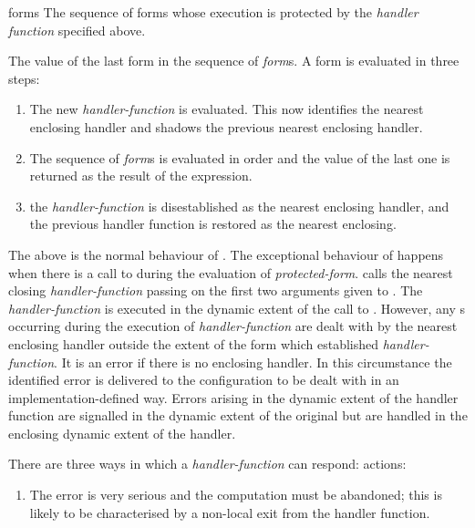 \begin{optDefinition}
\begin{arguments}
    \item[forms] The sequence of forms whose execution is protected by the {\em
        handler function} specified above.
\end{arguments}
%
\result%
The value of the last form in the sequence of {\em form}s.
%
\remarks%
%
A  form is evaluated in three steps:
\begin{enumerate}
    \item The new {\em handler-function} is evaluated. This now identifies the
    nearest enclosing handler and shadows the previous nearest enclosing
    handler.

    \item The sequence of {\em form}s is evaluated in order and the value of the
    last one is returned as the result of the 
    expression.

    \item the {\em handler-function} is disestablished as the nearest enclosing
    handler, and the previous handler function is restored as the nearest
    enclosing.
\end{enumerate}
%
The above is the normal behaviour of .  The exceptional
behaviour of  happens when there is a call to
 during the evaluation of {\em protected-form}.
 calls the nearest closing {\em handler-function} passing on
the first two arguments given to .  The {\em
    handler-function} is executed in the dynamic extent of the call to
.  However, any s occurring during the
execution of {\em handler-function} are dealt with by the nearest enclosing
handler outside the extent of the form which established {\em handler-function}.
It is an error if there is no enclosing handler. In this circumstance the
identified error is delivered to the configuration to be dealt with in an
implementation-defined way. Errors arising in the dynamic extent of the handler
function are signalled in the dynamic extent of the original
 but are handled in the enclosing dynamic extent of the
handler.

\examples
%
There are three ways in which a {\em handler-function} can respond:
actions:
\begin{enumerate}
    \item The error is very serious and the computation must be abandoned; this
    is likely to be characterised by a non-local exit from the handler
    function.


\end{enumerate}
\end{optDefinition}
